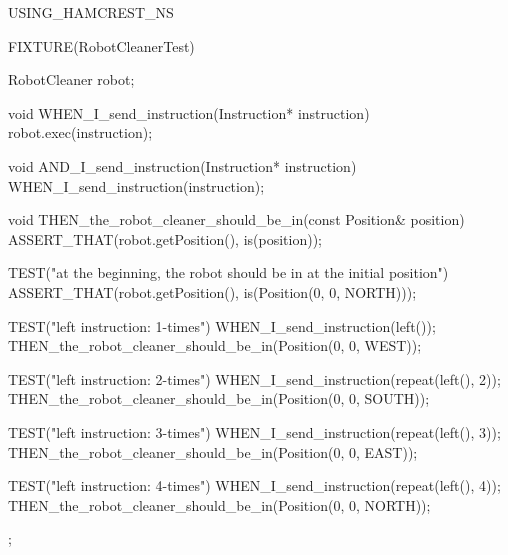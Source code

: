 \begin{content}
\begin{leftbar}
\begin{c++}[caption={test/robot-cleaner/RobotCleanerTest.cpp}]
USING_HAMCREST_NS

FIXTURE(RobotCleanerTest)
{
    RobotCleaner robot;

    void WHEN_I_send_instruction(Instruction* instruction)
    {
        robot.exec(instruction);
    }

    void AND_I_send_instruction(Instruction* instruction)
    {
        WHEN_I_send_instruction(instruction);
    }

    void THEN_the_robot_cleaner_should_be_in(const Position& position)
    {
        ASSERT_THAT(robot.getPosition(), is(position));
    }

    TEST("at the beginning, the robot should be in at the initial position")
    {
        ASSERT_THAT(robot.getPosition(), is(Position(0, 0, NORTH)));
    }

    TEST("left instruction: 1-times")
    {
        WHEN_I_send_instruction(left());
        THEN_the_robot_cleaner_should_be_in(Position(0, 0, WEST));
    }

    TEST("left instruction: 2-times")
    {
        WHEN_I_send_instruction(repeat(left(), 2));
        THEN_the_robot_cleaner_should_be_in(Position(0, 0, SOUTH));
    }

    TEST("left instruction: 3-times")
    {
        WHEN_I_send_instruction(repeat(left(), 3));
        THEN_the_robot_cleaner_should_be_in(Position(0, 0, EAST));
    }

    TEST("left instruction: 4-times")
    {
        WHEN_I_send_instruction(repeat(left(), 4));
        THEN_the_robot_cleaner_should_be_in(Position(0, 0, NORTH));
    }
};
\end{c++}
\end{leftbar}

\end{content}




